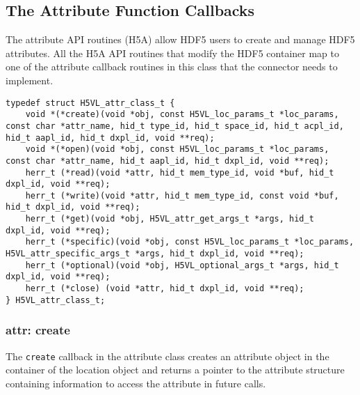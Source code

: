 
\subsection{The Attribute Function Callbacks}
The attribute API routines (H5A) allow HDF5 users to create and manage
HDF5 attributes. All the H5A API routines that modify the HDF5
container map to one of the attribute callback routines in this
class that the connector needs to implement.

\begin{lstlisting}[caption={Structure for attribute callback routines, H5VLconnector.h}, captionpos=b, label={lst:ATTRclass}]
typedef struct H5VL_attr_class_t {                                               
    void *(*create)(void *obj, const H5VL_loc_params_t *loc_params, const char *attr_name, hid_t type_id, hid_t space_id, hid_t acpl_id, hid_t aapl_id, hid_t dxpl_id, void **req);
    void *(*open)(void *obj, const H5VL_loc_params_t *loc_params, const char *attr_name, hid_t aapl_id, hid_t dxpl_id, void **req);
    herr_t (*read)(void *attr, hid_t mem_type_id, void *buf, hid_t dxpl_id, void **req);
    herr_t (*write)(void *attr, hid_t mem_type_id, const void *buf, hid_t dxpl_id, void **req);
    herr_t (*get)(void *obj, H5VL_attr_get_args_t *args, hid_t dxpl_id, void **req);
    herr_t (*specific)(void *obj, const H5VL_loc_params_t *loc_params, H5VL_attr_specific_args_t *args, hid_t dxpl_id, void **req);            
    herr_t (*optional)(void *obj, H5VL_optional_args_t *args, hid_t dxpl_id, void **req); 
    herr_t (*close) (void *attr, hid_t dxpl_id, void **req);                     
} H5VL_attr_class_t; 
\end{lstlisting}

\subsubsection{attr: create}
The \texttt{create} callback in the attribute class creates an
attribute object in the container of the location object and
returns a pointer to the attribute structure containing information to
access the attribute in future calls. \bigskip

